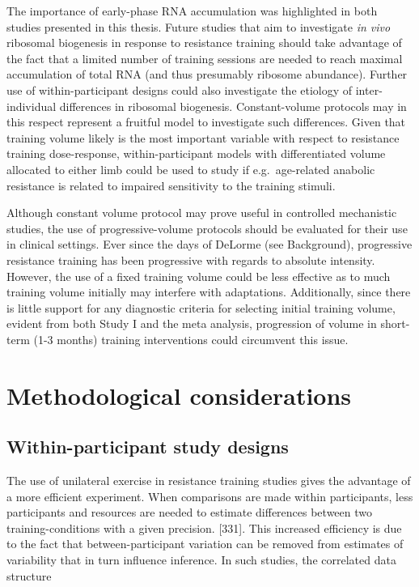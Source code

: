 \documentclass[twoside,10pt]{gihclass} %
\begin{document}
The importance of early-phase RNA accumulation was highlighted in both studies presented in this thesis. Future studies that aim to investigate \emph{in vivo} ribosomal biogenesis in response to resistance training should take advantage of the fact that a limited number of training sessions are needed to reach maximal accumulation of total RNA (and thus presumably ribosome abundance). Further use of within-participant designs could also investigate the etiology of inter-individual differences in ribosomal biogenesis. Constant-volume protocols may in this respect represent a fruitful model to investigate such differences. Given that training volume likely is the most important variable with respect to resistance training dose-response, within-participant models with differentiated volume allocated to either limb could be used to study if e.g.~age-related anabolic resistance is related to impaired sensitivity to the training stimuli.

Although constant volume protocol may prove useful in controlled mechanistic studies, the use of progressive-volume protocols should be evaluated for their use in clinical settings. Ever since the days of DeLorme (see Background), progressive resistance training has been progressive with regards to absolute intensity. However, the use of a fixed training volume could be less effective as to much training volume initially may interfere with adaptations. Additionally, since there is little support for any diagnostic criteria for selecting initial training volume, evident from both Study I and the meta analysis, progression of volume in short-term (1-3 months) training interventions could circumvent this issue.

\hypertarget{methodological-considerations}{%
\chapter{Methodological considerations}\label{methodological-considerations}}

\hypertarget{within-participant-study-designs}{%
\section{Within-participant study designs}\label{within-participant-study-designs}}

The use of unilateral exercise in resistance training studies gives the advantage of a more efficient experiment. When comparisons are made within participants, less participants and resources are needed to estimate differences between two training-conditions with a given precision.
{[}331{]}.
This increased efficiency is due to the fact that between-participant variation can be removed from estimates of variability that in turn influence inference.
In such studies, the correlated data structure
\end{document}
